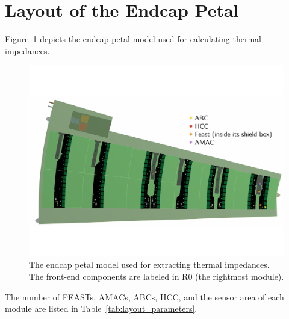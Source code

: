 
\section{Layout of the Endcap Petal}

Figure~\ref{endcap_model} depicts the endcap petal model used for calculating thermal impedances.

\begin{figure}[ht!]
\begin{center}
\includegraphics[width=0.99\linewidth]{figures/m30C_0Wm2C_Setup.pdf}
\end{center}
\caption{The endcap petal model used for extracting thermal impedances. The front-end components are
labeled in R0 (the rightmost module).}
\label{endcap_model}
\end{figure}

The number of FEASTs, AMACs, ABCs, HCC, and the sensor area of each module are listed in
Table~\ref{tab:layout_parameters}.
%
\let\arraystretcha\arraystretch
\renewcommand\arraystretch{1.1} %
\begin{table}[h]
\begin{center}
\end{center}
\caption{Number of components on each module.}
\label{tab:layout_parameters}
\end{table}
\let\arraystretch\arraystretcha

